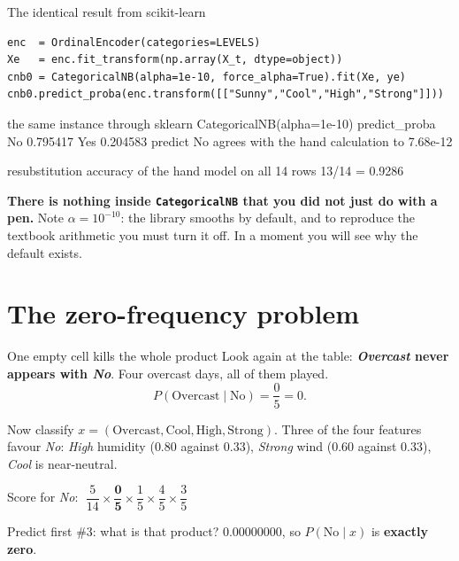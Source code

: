 \documentclass[aspectratio=169]{beamer}
\begin{document}
\begin{frame}[fragile,shrink=6]{The identical result from scikit-learn}
\begin{lstlisting}
enc  = OrdinalEncoder(categories=LEVELS)
Xe   = enc.fit_transform(np.array(X_t, dtype=object))
cnb0 = CategoricalNB(alpha=1e-10, force_alpha=True).fit(Xe, ye)
cnb0.predict_proba(enc.transform([["Sunny","Cool","High","Strong"]]))
\end{lstlisting}
\begin{outblk}
the same instance through sklearn CategoricalNB(alpha=1e-10)
      predict_proba  No 0.795417   Yes 0.204583
      predict        No
      agrees with the hand calculation to 7.68e-12
\end{outblk}
\begin{outblk}
resubstitution accuracy of the hand model on all 14 rows
      13/14 = 0.9286
\end{outblk}
\begin{alertblock}{}
  \centering\footnotesize
  \textbf{There is nothing inside \texttt{CategoricalNB} that you did not
  just do with a pen.} Note $\alpha = 10^{-10}$: the library smooths by
  default, and to reproduce the textbook arithmetic you must turn it off. In
  a moment you will see why the default exists.
\end{alertblock}
\end{frame}

\section[Zero frequency]{The zero-frequency problem}
\label{sec:zero}

\begin{frame}[shrink=6]{One empty cell kills the whole product}
  Look again at the table: \textbf{\emph{Overcast} never appears with
  \emph{No}}. Four overcast days, all of them played.
  \[
    P(\text{Overcast} \mid \text{No}) = \frac{0}{5} = 0.
  \]
  \begin{center}\small
    Now classify $x = (\text{Overcast}, \text{Cool}, \text{High},
    \text{Strong})$. Three of the four features favour \emph{No}:
    \emph{High} humidity ($0.80$ against $0.33$), \emph{Strong} wind
    ($0.60$ against $0.33$), \emph{Cool} is near-neutral.
  \end{center}
  \begin{center}
    \small Score for \emph{No}:
    $\;\dfrac{5}{14} \times \mathbf{\dfrac{0}{5}} \times \dfrac{1}{5}
    \times \dfrac{4}{5} \times \dfrac{3}{5}$
  \end{center}
  \begin{alertblock}{Predict first \#3: what is that product?}
    \centering
    \Large $\mathbf{0.00000000}$, so $P(\text{No} \mid x)$ is
    \textbf{exactly zero}.
  \end{alertblock}
\end{frame}
\end{document}
